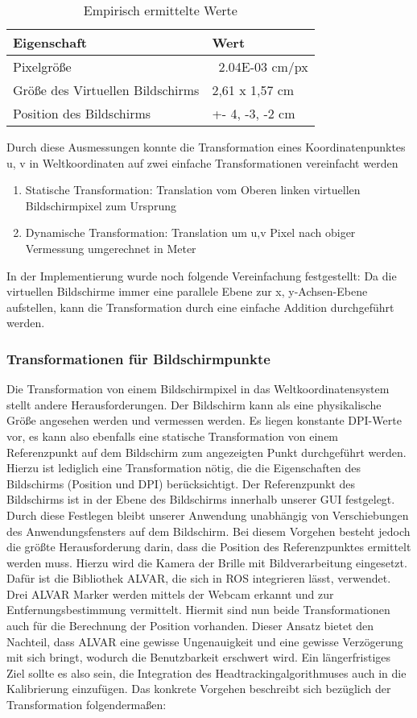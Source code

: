  \begin{table}[h]
 \begin{tabular}{l|l}
  Eigenschaft & Wert \\
  \hline
  \hline
  Pixelgröße & ~2.04E-03 cm/px \\
  Größe des Virtuellen Bildschirms & 2,61 x 1,57 cm \\
  Position des Bildschirms & +- 4, -3, -2 cm \\
 \end{tabular}
 \label{tab:konstanteWerte}
 \caption{Empirisch ermittelte Werte}
 \end{table}
Durch diese Ausmessungen konnte die  Transformation eines Koordinatenpunktes u, v in Weltkoordinaten auf zwei einfache Transformationen vereinfacht werden

   \begin{enumerate}
      \item Statische Transformation: Translation vom Oberen linken virtuellen Bildschirmpixel zum Ursprung
      \item Dynamische Transformation: Translation um u,v Pixel nach obiger Vermessung umgerechnet in Meter
   \end{enumerate}


In der Implementierung wurde noch folgende Vereinfachung festgestellt: Da die virtuellen Bildschirme immer eine parallele Ebene zur x, y-Achsen-Ebene aufstellen, kann die Transformation durch eine einfache Addition durchgeführt werden.

\subsubsection{Transformationen für Bildschirmpunkte}
\label{ssection:alva}
Die Transformation von einem Bildschirmpixel in das Weltkoordinatensystem stellt andere Herausforderungen. 
Der Bildschirm kann als eine physikalische Größe angesehen werden und vermessen werden. 
Es liegen konstante  \ac{DPI}-Werte vor, es kann also ebenfalls eine statische Transformation von einem Referenzpunkt auf dem Bildschirm zum angezeigten Punkt durchgeführt werden. 
Hierzu ist lediglich eine Transformation nötig, die die Eigenschaften des Bildschirms (Position und DPI) berücksichtigt. 
Der Referenzpunkt des Bildschirms ist in der Ebene des Bildschirms innerhalb unserer GUI festgelegt. Durch diese Festlegen bleibt unserer Anwendung unabhängig von Verschiebungen des Anwendungsfensters auf dem Bildschirm. 
Bei diesem Vorgehen besteht jedoch die größte Herausforderung darin, dass die Position des Referenzpunktes ermittelt werden muss. 
Hierzu wird die Kamera der Brille mit Bildverarbeitung eingesetzt. 
Dafür ist die Bibliothek ALVAR, die sich in ROS integrieren lässt, verwendet.
Drei ALVAR Marker werden mittels der Webcam erkannt und zur Entfernungsbestimmung vermittelt. 
Hiermit sind nun beide Transformationen auch für die Berechnung der Position vorhanden. 
Dieser Ansatz bietet den Nachteil, dass ALVAR eine gewisse Ungenauigkeit und eine gewisse Verzögerung mit sich bringt, wodurch die Benutzbarkeit erschwert wird. 
Ein längerfristiges Ziel sollte es also sein, die Integration des Headtrackingalgorithmuses auch in die Kalibrierung einzufügen.
Das konkrete Vorgehen beschreibt sich bezüglich der Transformation folgendermaßen:

